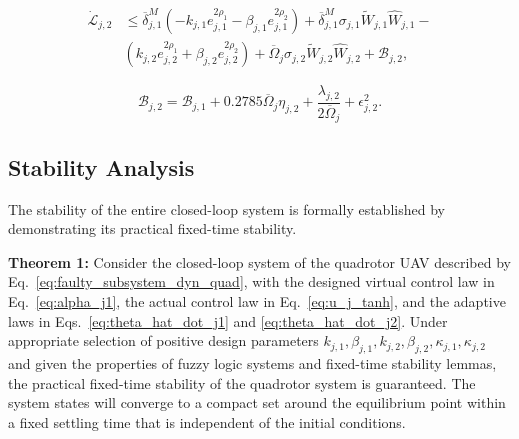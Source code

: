 \begin{equation} \label{eq:dL_j2_final_expanded} 
\begin{aligned} \dot{\mathcal{L}}_{j,2} &\leq \overline{\delta}_{j,1}^M\left(-k_{j,1}e_{j,1}^{2\rho_{1}} - \beta_{j,1}e_{j,1}^{2\rho_{2}}\right) + \overline{\delta}_{j,1}^M\sigma_{j,1}\tilde{W}_{j,1}\hat{W}_{j,1} - \\ & \left(k_{j,2}e_{j,2}^{2\rho_{1}} + \beta_{j,2}e_{j,2}^{2\rho_{2}}\right) + \overline{\Omega}_{j}\sigma_{j,2}\tilde{W}_{j,2}\hat{W}_{j,2} + \mathcal{B}_{j,2}, 
\end{aligned} 
\end{equation} 

\begin{equation} \label{eq:h_j2} \mathcal{B}_{j,2} = \mathcal{B}_{j,1} + 0.2785\overline{\Omega}_{j}\eta_{j,2} + \frac{\lambda_{j,2}}{2\overline{\Omega}_{j}} + \epsilon_{j,2}^{2}. 
\end{equation}



\subsection{Stability Analysis}
\label{sec:stability_analysis_quadrotor}

The stability of the entire closed-loop system is formally established by demonstrating its practical fixed-time stability.

\textbf{Theorem 1:} Consider the closed-loop system of the quadrotor UAV described by Eq.~\eqref{eq:faulty_subsystem_dyn_quad}, with the designed virtual control law in Eq.~\eqref{eq:alpha_j1}, the actual control law in Eq.~\eqref{eq:u_j_tanh}, and the adaptive laws in Eqs.~\eqref{eq:theta_hat_dot_j1} and \eqref{eq:theta_hat_dot_j2}. Under appropriate selection of positive design parameters $k_{j,1}, \beta_{j,1}, k_{j,2}, \beta_{j,2}, \kappa_{j,1}, \kappa_{j,2}$ and given the properties of fuzzy logic systems and fixed-time stability lemmas, the practical fixed-time stability of the quadrotor system is guaranteed. The system states will converge to a compact set around the equilibrium point within a fixed settling time that is independent of the initial conditions.

